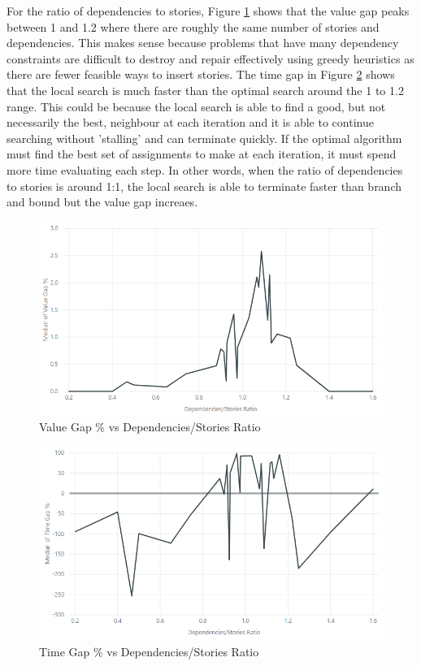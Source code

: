 For the ratio of dependencies to stories, Figure \ref{fig:value_gap_vs_dependencies_stories} shows that the value gap peaks between 1 and 1.2 where there are roughly the same number of stories and dependencies. This makes sense because problems that have many dependency constraints are difficult to destroy and repair effectively using greedy heuristics as there are fewer feasible ways to insert stories. The time gap in Figure \ref{fig:time_gap_vs_dependencies_stories} shows that the local search is much faster than the optimal search around the 1 to 1.2 range. This could be because the local search is able to find a good, but not necessarily the best, neighbour at each iteration and it is able to continue searching without 'stalling' and can terminate quickly. If the optimal algorithm must find the best set of assignments to make at each iteration, it must spend more time evaluating each step. In other words, when the ratio of dependencies to stories is around 1:1, the local search is able to terminate faster than branch and bound but the value gap increaes.

\begin{figure}[h!]
    \centering
    \includegraphics[width=\textwidth]{Figures/Results/annealing_value_gap_dependencies_stories.png}
    \caption{Value Gap \% vs Dependencies/Stories Ratio}
    \label{fig:value_gap_vs_dependencies_stories}
\end{figure}

\begin{figure}[h!]
    \centering
    \includegraphics[width=\textwidth]{Figures/Results/annealing_time_gap_dependencies_stories.png}
    \caption{Time Gap \% vs Dependencies/Stories Ratio}
    \label{fig:time_gap_vs_dependencies_stories}
\end{figure}

